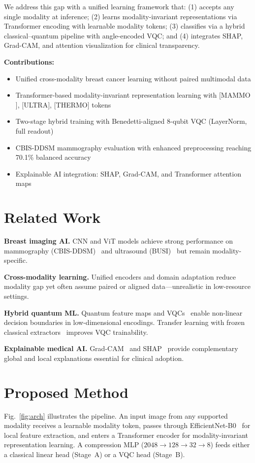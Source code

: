 \documentclass[journal]{IEEEtran}
\begin{document}
We address this gap with a unified learning framework that: (1) accepts any single modality at inference; (2) learns modality-invariant representations via Transformer encoding with learnable modality tokens; (3) classifies via a hybrid classical--quantum pipeline with angle-encoded VQC; and (4) integrates SHAP, Grad-CAM, and attention visualization for clinical transparency.

\textbf{Contributions:}
\begin{itemize}
    \item Unified cross-modality breast cancer learning without paired multimodal data
    \item Transformer-based modality-invariant representation learning with $[$MAMMO$]$, $[$ULTRA$]$, $[$THERMO$]$ tokens
    \item Two-stage hybrid training with Benedetti-aligned 8-qubit VQC (LayerNorm, full readout)~\cite{benedetti2019vqc}
    \item CBIS-DDSM mammography evaluation with enhanced preprocessing reaching 70.1\% balanced accuracy
    \item Explainable AI integration: SHAP, Grad-CAM, and Transformer attention maps
\end{itemize}

\section{Related Work}
\textbf{Breast imaging AI.} CNN and ViT models achieve strong performance on mammography (CBIS-DDSM)~\cite{lee2017cbis} and ultrasound (BUSI)~\cite{aldhabyani2020busi} but remain modality-specific.

\textbf{Cross-modality learning.} Unified encoders and domain adaptation reduce modality gap yet often assume paired or aligned data---unrealistic in low-resource settings.

\textbf{Hybrid quantum ML.} Quantum feature maps and VQCs~\cite{schuld2019quantum,havlicek2019supervised,benedetti2019vqc} enable non-linear decision boundaries in low-dimensional encodings. Transfer learning with frozen classical extractors~\cite{mari2020transfer} improves VQC trainability.

\textbf{Explainable medical AI.} Grad-CAM~\cite{selvaraju2017gradcam} and SHAP~\cite{lundberg2017shap} provide complementary global and local explanations essential for clinical adoption.

\section{Proposed Method}
Fig.~\ref{fig:arch} illustrates the pipeline. An input image from any supported modality receives a learnable modality token, passes through EfficientNet-B0~\cite{tan2019efficientnet} for local feature extraction, and enters a Transformer encoder for modality-invariant representation learning. A compression MLP ($2048 \rightarrow 128 \rightarrow 32 \rightarrow 8$) feeds either a classical linear head (Stage~A) or a VQC head (Stage~B).
\end{document}
